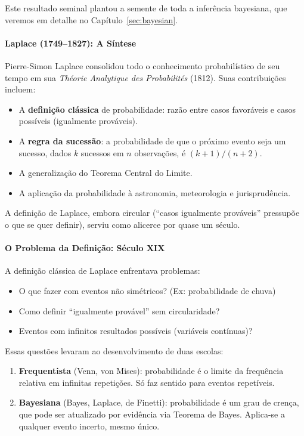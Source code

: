 \documentclass{tufte-handout}
\begin{document}
Este resultado seminal plantou a semente de toda a inferência bayesiana, que veremos
em detalhe no Capítulo~\ref{sec:bayesian}.

\paragraph{Laplace (1749--1827): A Síntese}

Pierre-Simon Laplace consolidou todo o conhecimento probabilístico de seu tempo em sua
\textit{Théorie Analytique des Probabilités} (1812). Suas contribuições incluem:
\begin{itemize}
    \item A \textbf{definição clássica} de probabilidade: razão entre casos favoráveis e
    casos possíveis (igualmente prováveis).
    \item A \textbf{regra da sucessão}: a probabilidade de que o próximo evento seja um
    sucesso, dados $k$ sucessos em $n$ observações, é $(k+1)/(n+2)$.
    \item A generalização do Teorema Central do Limite.
    \item A aplicação da probabilidade à astronomia, meteorologia e jurisprudência.
\end{itemize}

A definição de Laplace, embora circular (``casos igualmente prováveis'' pressupõe o que
se quer definir), serviu como alicerce por quase um século.

\paragraph{O Problema da Definição: Século XIX}

A definição clássica de Laplace enfrentava problemas:
\begin{itemize}
    \item O que fazer com eventos não simétricos? (Ex: probabilidade de chuva)
    \item Como definir ``igualmente provável'' sem circularidade?
    \item Eventos com infinitos resultados possíveis (variáveis contínuas)?
\end{itemize}

Essas questões levaram ao desenvolvimento de duas escolas:
\begin{enumerate}
    \item \textbf{Frequentista} (Venn, von Mises): probabilidade é o limite da frequência
    relativa em infinitas repetições. Só faz sentido para eventos repetíveis.
    \item \textbf{Bayesiana} (Bayes, Laplace, de Finetti): probabilidade é um grau de
    crença, que pode ser atualizado por evidência via Teorema de Bayes. Aplica-se a
    qualquer evento incerto, mesmo único.
\end{enumerate}
\end{document}
